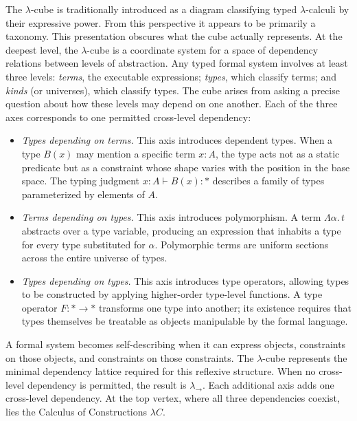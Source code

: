 \documentclass[12pt,a4paper]{article}
\theoremstyle{plain}
\theoremstyle{definition}
\begin{document}
The $\lambda$-cube is traditionally introduced as a diagram classifying typed
$\lambda$-calculi by their expressive power. From this perspective it appears
to be primarily a taxonomy. This presentation obscures what the cube actually
represents. At the deepest level, the $\lambda$-cube is a coordinate system
for a space of dependency relations between levels of abstraction. Any typed
formal system involves at least three levels: \emph{terms}, the executable
expressions; \emph{types}, which classify terms; and \emph{kinds} (or
universes), which classify types. The cube arises from asking a precise question
about how these levels may depend on one another. Each of the three axes
corresponds to one permitted cross-level dependency:

\begin{itemize}[leftmargin=2em]
\item \emph{Types depending on terms.} This axis introduces dependent types.
When a type $B(x)$ may mention a specific term $x : A$, the type acts not as a
static predicate but as a constraint whose shape varies with the position in the
base space. The typing judgment $x : A \vdash B(x) : *$ describes a family of
types parameterized by elements of $A$.

\item \emph{Terms depending on types.} This axis introduces polymorphism. A
term $\Lambda\alpha.\, t$ abstracts over a type variable, producing an
expression that inhabits a type for every type substituted for $\alpha$.
Polymorphic terms are uniform sections across the entire universe of types.

\item \emph{Types depending on types.} This axis introduces type operators,
allowing types to be constructed by applying higher-order type-level functions.
A type operator $F : * \to *$ transforms one type into another; its existence
requires that types themselves be treatable as objects manipulable by the formal
language.
\end{itemize}

A formal system becomes self-describing when it can express objects, constraints
on those objects, and constraints on those constraints. The $\lambda$-cube
represents the minimal dependency lattice required for this reflexive structure.
When no cross-level dependency is permitted, the result is $\lambda_\to$. Each
additional axis adds one cross-level dependency. At the top vertex, where all
three dependencies coexist, lies the Calculus of Constructions $\lambda C$.
\end{document}
